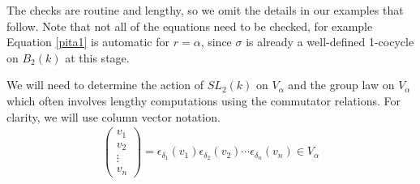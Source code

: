 The checks are routine and lengthy, so we omit the details in our examples that follow. Note that not all of the equations need to be checked, for example Equation \ref{pita1} is automatic for $r=\alpha$, since $\sigma$ is already a well-defined 1-cocycle on $B_2(k)$ at this stage.

We will need to determine the action of $SL_2(k)$ on $V_\alpha$ and the group law on $V_\alpha$ which often involves lengthy computations using the commutator relations. For clarity, we will use column vector notation.
\begin{align*}
\left(\begin{matrix}
	v_{1}\\ v_{2}\\ \vdots\\ v_{n}
\end{matrix}\right) = \epsilon_{\delta_1}(v_1)\epsilon_{\delta_2}(v_2)\cdots\epsilon_{\delta_n}(v_n) \in V_\alpha
\end{align*}

